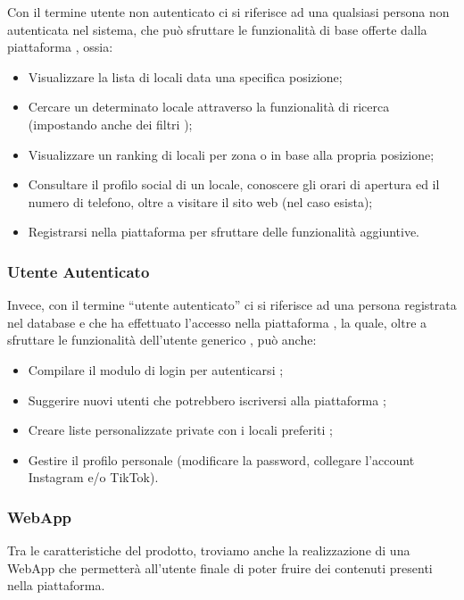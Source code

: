Con il termine utente non autenticato \glo ci si riferisce ad una qualsiasi persona non autenticata nel sistema, che può sfruttare le funzionalità di base offerte dalla piattaforma \glo, ossia:

\begin{itemize}
  \item Visualizzare la lista di locali \glo data una specifica posizione;
  \item Cercare un determinato locale attraverso la funzionalità di ricerca (impostando anche dei filtri \glo);
  \item Visualizzare un ranking \glo di locali per zona o in base alla propria posizione;
  \item Consultare il profilo \glo social di un locale, conoscere gli orari di apertura ed il numero di telefono, oltre a visitare il sito web (nel caso esista);
  \item Registrarsi nella piattaforma per sfruttare delle funzionalità aggiuntive.
\end{itemize}

\subsubsection{Utente Autenticato}

Invece, con il termine “utente autenticato\glo{}” ci si riferisce ad una persona registrata nel database e che ha effettuato l'accesso nella piattaforma \glo, la quale, oltre a sfruttare le funzionalità dell’utente generico \glo, può anche:

\begin{itemize}
  \item Compilare il modulo di login per autenticarsi \glo{};
  \item Suggerire nuovi utenti \glo che potrebbero iscriversi alla piattaforma \glo{};
  \item Creare liste personalizzate private \glo con i locali preferiti \glo{};
  \item Gestire il profilo personale (modificare la password, collegare l'account Instagram e/o TikTok).
\end{itemize}

\subsubsection{WebApp}

Tra le caratteristiche del prodotto, troviamo anche la realizzazione di una WebApp che permetterà all'utente finale di poter fruire dei contenuti presenti nella piattaforma.

